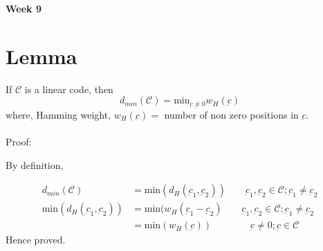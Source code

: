 \documentclass{article}
\begin{document}
\begin{center}
\textbf{\huge{Week 9}}
\end{center}

\section{Lemma}
If $\mathscr{C}$ is a linear code, then
$$ d_{min}(\mathscr{C})= \text{min}_{\underbar{c} \neq 0}w_H (\underbar{c})$$
where, Hamming weight, $w_H(\underbar{c})=$ number of non zero positions in $\underbar{c}$.
\\ \\
Proof:

By definition,

    \begin{align*}
        d_{min}(\mathscr{C})&=\text{min} (d_H(\underbar{c}_1, \underbar{c}_2)) \qquad \underbar{c}_1, \underbar{c}_2 \in \mathscr{C} ; \underbar{c}_1 \neq \underbar{c}_2 \\
        \text{min} (d_H(\underbar{c}_1, \underbar{c}_2))& = \text{min} (w_H(\underbar{c}_1 - \underbar{c}_2) \qquad \underbar{c}_1, \underbar{c}_2 \in \mathscr{C} ; \underbar{c}_1 \neq \underbar{c}_2 \\
        &= \text{min}(w_H(\underbar{c})) \qquad\qquad    \underbar{c}\neq 0 ; \underbar{c} \in \mathscr{C}
    \end{align*}
    Hence proved.
\end{document}
